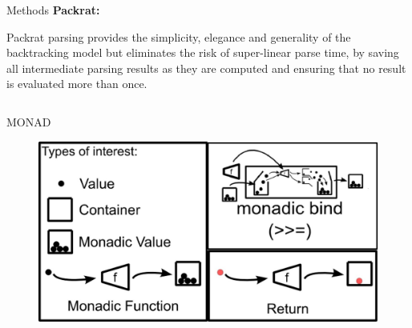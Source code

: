 \documentclass[final]{beamer}
\newlength{\onecolwid}
\newlength{\twocolwid}
\begin{document}
\begin{frame}[t]
\begin{columns}[t]
\begin{column}{\twocolwid}
\begin{columns}[t,totalwidth=\twocolwid]
\begin{column}{\onecolwid}
\begin{block}{Methods}
\textbf{Packrat:}

Packrat parsing provides the simplicity, elegance and generality of the backtracking model but eliminates the risk of super-linear parse time, by saving all intermediate parsing results as they are computed and ensuring that no result is evaluated more than once.



\end{block}


\end{column} %

\end{columns} %

\begin{alertblock}{MONAD}

\begin{figure}
\includegraphics[width=0.8\linewidth]{img/monad.jpg}

\end{figure}
\end{alertblock}


\end{column}
\end{columns}
\end{frame}
\end{document}
